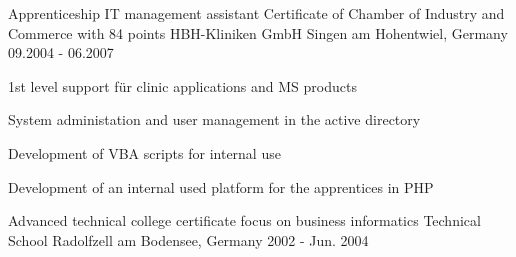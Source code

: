 

\begin{cventries}

  \cventry
    {Apprenticeship IT management assistant Certificate of Chamber of Industry and Commerce with 84 points} %
    {HBH-Kliniken GmbH} %
    {Singen am Hohentwiel, Germany} %
    {09.2004 - 06.2007} %
    {
      \begin{cvitems} %
        \item {1st level support für clinic applications and MS products}
        \item {System administation and user management in the active directory}
        \item {Development of VBA scripts for internal use}
        \item {Development of an internal used platform for the apprentices in PHP}
      \end{cvitems}
    }

  \cventry
    {Advanced technical college certificate  focus on business informatics} %
    {Technical School} %
    {Radolfzell am Bodensee, Germany} %
    {2002 - Jun. 2004} %

\end{cventries}
